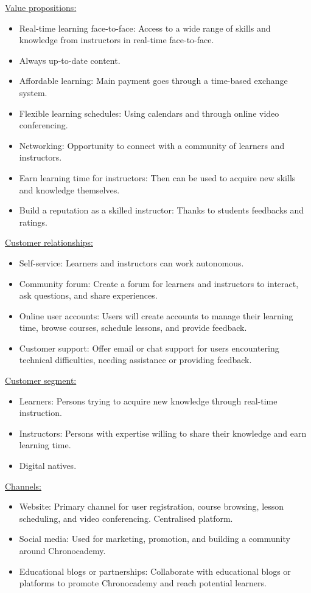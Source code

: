 \underline{Value propositions:}
\begin{itemize}
\item Real-time learning face-to-face: Access to a wide range of skills and knowledge from instructors in real-time face-to-face.
\item Always up-to-date content.
\item Affordable learning: Main payment goes through a time-based exchange system.
\item Flexible learning schedules: Using calendars and through online video conferencing.
\item Networking: Opportunity to connect with a community of learners and instructors.
\item Earn learning time for instructors: Then can be used to acquire new skills and knowledge themselves.
\item Build a reputation as a skilled instructor: Thanks to students feedbacks and ratings.
\end{itemize}

\underline{Customer relationships:}
\begin{itemize}
\item Self-service: Learners and instructors can work autonomous.
\item Community forum: Create a forum for learners and instructors to interact, ask questions, and share experiences.
\item Online user accounts: Users will create accounts to manage their learning time, browse courses, schedule lessons, and provide feedback.
\item Customer support: Offer email or chat support for users encountering technical difficulties, needing assistance or providing feedback.
\end{itemize}

\underline{Customer segment:}
\begin{itemize}
\item Learners: Persons trying to acquire new knowledge through real-time instruction.
\item Instructors: Persons with expertise willing to share their knowledge and earn learning time.
\item Digital natives.
\end{itemize}

\underline{Channels:}
\begin{itemize}
\item Website: Primary channel for user registration, course browsing, lesson scheduling, and video conferencing.
Centralised platform.
\item Social media: Used for marketing, promotion, and building a community around Chronocademy.
\item Educational blogs or partnerships: Collaborate with educational blogs or platforms to promote Chronocademy and reach potential learners.
\end{itemize}

